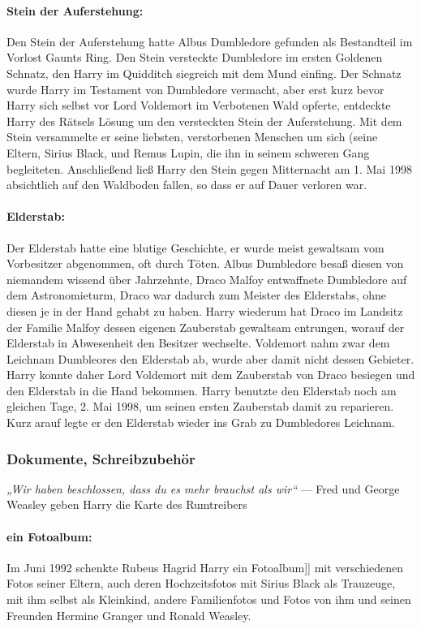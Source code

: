 \documentclass[a4paper, 10pt]{article}
\begin{document}
\paragraph{Stein der Auferstehung:}
Den Stein der Auferstehung hatte Albus Dumbledore gefunden als Bestandteil im Vorlost Gaunts Ring. Den Stein versteckte Dumbledore im ersten Goldenen Schnatz, den Harry im Quidditch siegreich mit dem Mund einfing. Der Schnatz wurde Harry im Testament von Dumbledore vermacht, aber erst kurz bevor Harry sich selbst vor Lord Voldemort im Verbotenen Wald opferte, entdeckte Harry des Rätsels Lösung um den versteckten Stein der Auferstehung. Mit dem Stein versammelte er seine liebsten, verstorbenen Menschen um sich (seine Eltern, Sirius Black, und Remus Lupin, die ihn in seinem schweren Gang begleiteten. Anschließend ließ Harry den Stein gegen Mitternacht am 1. Mai 1998 absichtlich auf den Waldboden fallen, so dass er auf Dauer verloren war.
\paragraph{Elderstab:}
Der Elderstab hatte eine blutige Geschichte, er wurde meist gewaltsam vom Vorbesitzer abgenommen, oft durch Töten. Albus Dumbledore besaß diesen von niemandem wissend über Jahrzehnte, Draco Malfoy entwaffnete Dumbledore auf dem Astronomieturm, Draco war dadurch zum Meister des Elderstabs, ohne diesen je in der Hand gehabt zu haben. Harry wiederum hat Draco im Landsitz der Familie Malfoy dessen eigenen Zauberstab gewaltsam entrungen, worauf der Elderstab in Abwesenheit den Besitzer wechselte. Voldemort nahm zwar dem Leichnam Dumbleores den Elderstab ab, wurde aber damit nicht dessen Gebieter. Harry konnte daher Lord Voldemort mit dem Zauberstab von Draco besiegen und den Elderstab in die Hand bekommen. Harry benutzte den Elderstab noch am gleichen Tage, 2. Mai 1998, um seinen ersten Zauberstab damit zu reparieren. Kurz arauf legte er den Elderstab wieder ins Grab zu Dumbledores Leichnam.

\subsubsection*{\large Dokumente, Schreibzubehör}
\textit{„Wir haben beschlossen, dass du es mehr brauchst als wir“}
\vspace{10pt}
\newline
— Fred und George Weasley geben Harry die Karte des Rumtreibers

\paragraph{ein Fotoalbum:}
Im Juni 1992 schenkte Rubeus Hagrid Harry ein Fotoalbum]] mit verschiedenen Fotos seiner Eltern, auch deren Hochzeitsfotos mit Sirius Black als Trauzeuge, mit ihm selbst als Kleinkind, andere Familienfotos und Fotos von ihm und seinen Freunden Hermine Granger und Ronald Weasley.
\end{document}
